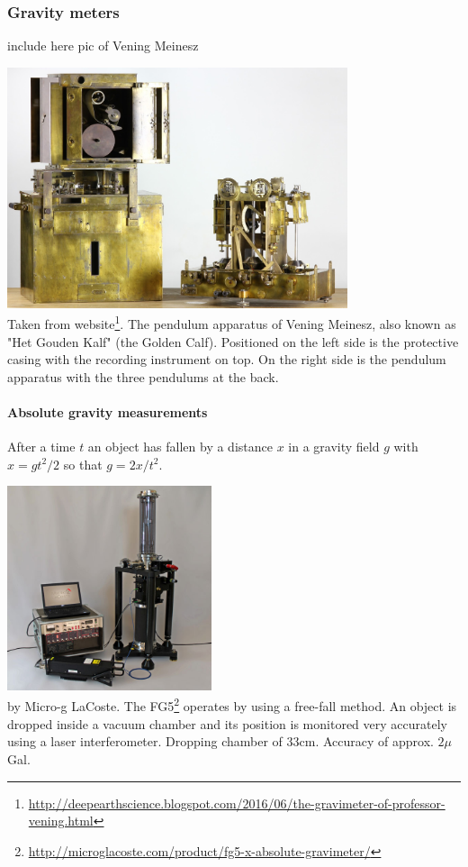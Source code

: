


\subsubsection{Gravity meters}


include here pic of Vening Meinesz

\begin{center}
\includegraphics[width=10cm]{images/gravity/Gouden_kalf}\\
{\captionfont 
Taken from 
website\footnote{\url{http://deepearthscience.blogspot.com/2016/06/the-gravimeter-of-professor-vening.html}}.
The pendulum apparatus of Vening Meinesz, also known as "Het Gouden Kalf" (the Golden Calf). Positioned on the left side is the protective casing with the recording instrument on top. On the right side is the pendulum apparatus with the three pendulums at the back. }
\end{center}


\paragraph{Absolute gravity measurements}

After a time $t$ an object has fallen by a distance $x$ in a gravity field $g$
with $x=gt^2/2$ so that $g=2x/t^2$.

\begin{center}
\includegraphics[width=6cm]{images/gravity/fg5}\\
{\captionfont by Micro-g LaCoste. 
The FG5\footnote{\url{http://microglacoste.com/product/fg5-x-absolute-gravimeter/}}
 operates by using a free-fall method. An object is dropped inside a vacuum 
chamber and its position is monitored very accurately using a laser interferometer. 
Dropping chamber of 33cm. Accuracy of approx. $2\mu$Gal.}
\end{center}



